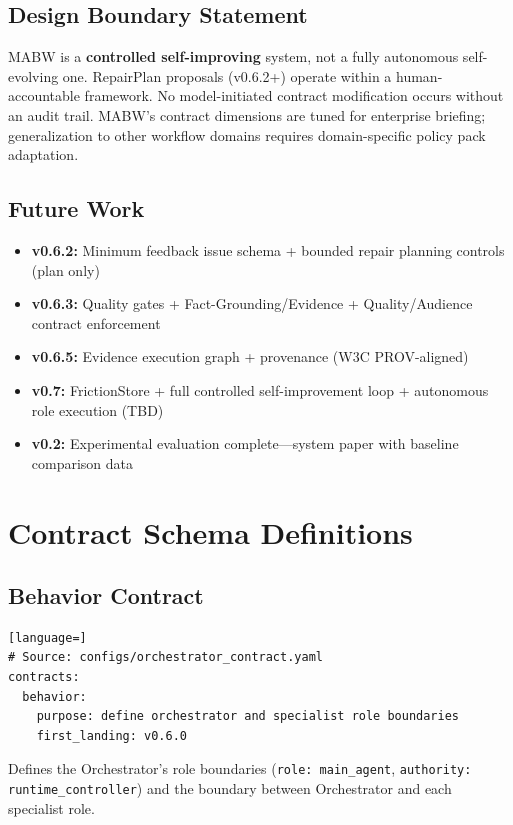 \documentclass[11pt,a4paper]{article}
\begin{document}
\subsection{Design Boundary Statement}

MABW is a \textbf{controlled self-improving} system, not a fully autonomous self-evolving one. RepairPlan proposals (v0.6.2+) operate within a human-accountable framework. No model-initiated contract modification occurs without an audit trail. MABW's contract dimensions are tuned for enterprise briefing; generalization to other workflow domains requires domain-specific policy pack adaptation.

\subsection{Future Work}

\begin{itemize}[leftmargin=*,itemsep=1pt]
    \item \textbf{v0.6.2:} Minimum feedback issue schema + bounded repair planning controls (plan only)
    \item \textbf{v0.6.3:} Quality gates + Fact-Grounding/Evidence + Quality/Audience contract enforcement
    \item \textbf{v0.6.5:} Evidence execution graph + provenance (W3C PROV-aligned)
    \item \textbf{v0.7:} FrictionStore + full controlled self-improvement loop + autonomous role execution (TBD)
    \item \textbf{v0.2:} Experimental evaluation complete---system paper with baseline comparison data
\end{itemize}

\appendix

\section{Contract Schema Definitions}
\label{sec:appendix-contracts}

\subsection{Behavior Contract}
\begin{lstlisting}[language=]
# Source: configs/orchestrator_contract.yaml
contracts:
  behavior:
    purpose: define orchestrator and specialist role boundaries
    first_landing: v0.6.0
\end{lstlisting}
Defines the Orchestrator's role boundaries (\texttt{role: main\_agent}, \texttt{authority: runtime\_controller}) and the boundary between Orchestrator and each specialist role.
\end{document}
